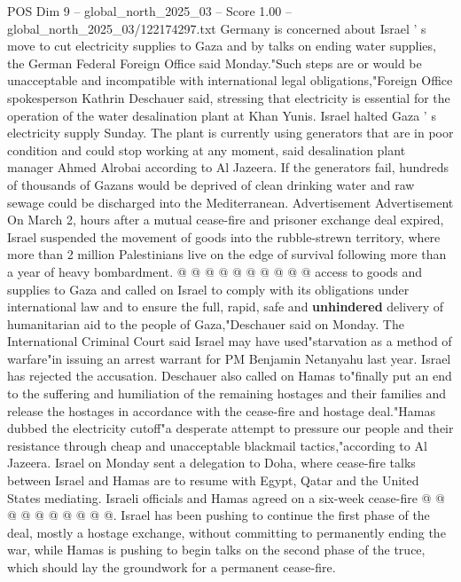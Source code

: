 \begin{textsample}{POS Dim 9 – global\_north\_2025\_03 – Score 1.00 – global\_north\_2025\_03/122174297.txt}  \label{ex:f9_pos_381}
Germany is concerned about Israel ' s move to cut electricity supplies to Gaza and by talks on ending water supplies, the German Federal Foreign Office said Monday."Such steps are or would be unacceptable and incompatible with international legal obligations,"Foreign Office spokesperson Kathrin Deschauer said, stressing that electricity is essential for the operation of the water desalination plant at Khan Yunis.
Israel halted Gaza ' s electricity supply Sunday.
The plant is currently using generators that are in poor condition and could stop working at any moment, said desalination plant manager Ahmed Alrobai according to Al Jazeera.
If the generators fail, hundreds of thousands of Gazans would be deprived of clean drinking water and raw sewage could be discharged into the Mediterranean.
Advertisement Advertisement On March 2, hours after a mutual cease-fire and prisoner exchange deal expired, Israel suspended the movement of goods into the rubble-strewn territory, where more than 2 million Palestinians live on the edge of survival following more than a year of heavy bombardment. @ @ @ @ @ @ @ @ @ @ access to goods and supplies to Gaza and called on Israel to comply with its obligations under international law and to ensure the full, rapid, safe and \textbf{unhindered} delivery of humanitarian aid to the people of Gaza,"Deschauer said on Monday.
The International Criminal Court said Israel may have used"starvation as a method of warfare"in issuing an arrest warrant for PM Benjamin Netanyahu last year.
Israel has rejected the accusation.
Deschauer also called on Hamas to"finally put an end to the suffering and humiliation of the remaining hostages and their families and release the hostages in accordance with the cease-fire and hostage deal."Hamas dubbed the electricity cutoff"a desperate attempt to pressure our people and their resistance through cheap and unacceptable blackmail tactics,"according to Al Jazeera.
Israel on Monday sent a delegation to Doha, where cease-fire talks between Israel and Hamas are to resume with Egypt, Qatar and the United States mediating.
Israeli officials and Hamas agreed on a six-week cease-fire @ @ @ @ @ @ @ @ @ @.
Israel has been pushing to continue the first phase of the deal, mostly a hostage exchange, without committing to permanently ending the war, while Hamas is pushing to begin talks on the second phase of the truce, which should lay the groundwork for a permanent cease-fire.

\end{textsample}
